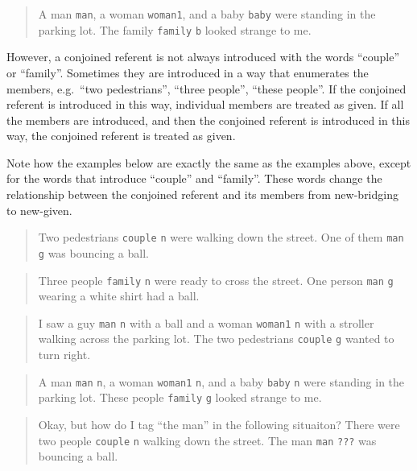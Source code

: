 \documentclass[
]{book}
\begin{document}
\begin{quote}
A man \texttt{man}, a woman \texttt{woman1}, and a baby \texttt{baby} were standing in the parking lot.
The family \texttt{family} \texttt{b} looked strange to me.
\end{quote}

However, a conjoined referent is not always introduced with the words ``couple'' or ``family''.
Sometimes they are introduced in a way that enumerates the members, e.g.~``two pedestrians'', ``three people'', ``these people''.
If the conjoined referent is introduced in this way, individual members are treated as given.
If all the members are introduced, and then the conjoined referent is introduced in this way, the conjoined referent is treated as given.

Note how the examples below are exactly the same as the examples above, except for the words that introduce ``couple'' and ``family''. These words change the relationship between the conjoined referent and its members from new-bridging to new-given.

\begin{quote}
Two pedestrians \texttt{couple} \texttt{n} were walking down the street.
One of them \texttt{man} \texttt{g} was bouncing a ball.
\end{quote}

\begin{quote}
Three people \texttt{family} \texttt{n} were ready to cross the street.
One person \texttt{man} \texttt{g} wearing a white shirt had a ball.
\end{quote}

\begin{quote}
I saw a guy \texttt{man} \texttt{n} with a ball and a woman \texttt{woman1} \texttt{n} with a stroller walking across the parking lot.
The two pedestrians \texttt{couple} \texttt{g} wanted to turn right.
\end{quote}

\begin{quote}
A man \texttt{man} \texttt{n}, a woman \texttt{woman1} \texttt{n}, and a baby \texttt{baby} \texttt{n} were standing in the parking lot.
These people \texttt{family} \texttt{g} looked strange to me.
\end{quote}

\begin{quote}
Okay, but how do I tag ``the man'' in the following situaiton?
There were two people \texttt{couple} \texttt{n} walking down the street.
The man \texttt{man} \texttt{???} was bouncing a ball.
\end{quote}
\end{document}
